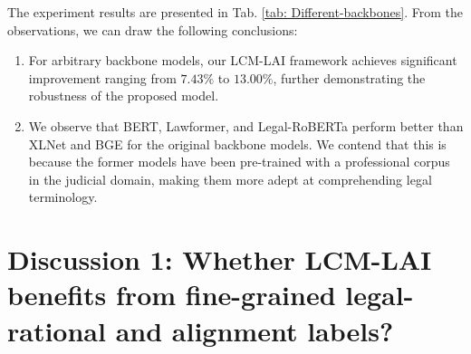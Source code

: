 The experiment results are presented in Tab. \ref{tab: Different-backbones}. 
From the observations, we can draw the following conclusions:

\begin{enumerate}
    \item{
    For arbitrary backbone models, our LCM-LAI framework achieves significant improvement ranging from $7.43\%$ to $13.00\%$, further demonstrating the robustness of the proposed model.
    }
    \item{
    We observe that BERT, Lawformer, and Legal-RoBERTa perform better than XLNet and BGE for the original backbone models.
    We contend that this is because the former models have been pre-trained with a professional corpus in the judicial domain,  making them more adept at comprehending legal terminology.
    }
\end{enumerate}



\section{Discussion 1: Whether LCM-LAI benefits from fine-grained legal-rational and alignment labels?}

